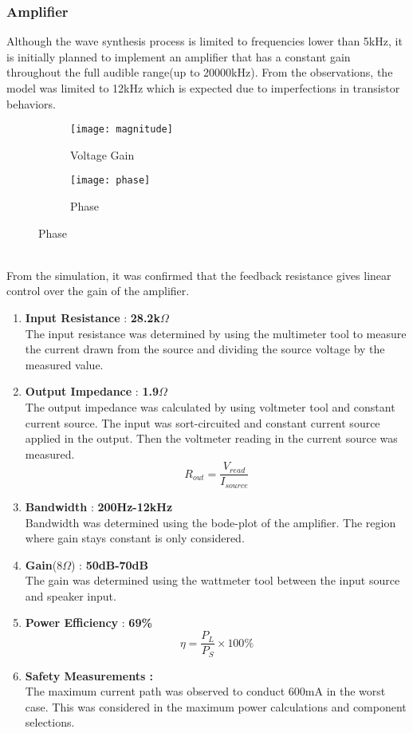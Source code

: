 \subsubsection*{Amplifier}
Although the wave synthesis process is limited to frequencies lower than 5kHz, it is initially planned to implement an amplifier that has a constant gain throughout the full audible range(up to 20000kHz). From the observations, the model was limited to 12kHz which is expected due to imperfections in transistor behaviors.
\begin{figure}[h]
    \begin{subfigure}{.48\columnwidth}
        \texttt{[image: magnitude]}
        \caption*{Voltage Gain}
    \end{subfigure}
    \begin{subfigure}{.48\columnwidth}
        \texttt{[image: phase]}
        \caption*{Phase}
    \end{subfigure}
\end{figure}
\\
From the simulation, it was confirmed that the feedback resistance gives linear control over the gain of the amplifier.
\begin{enumerate}
    \item \textbf{Input Resistance} : \textbf{28.2k$\Omega$}\\The input resistance was determined by using the multimeter tool to measure the current drawn from the source and dividing the source voltage by the measured value.
    \item \textbf{Output Impedance} : \textbf{1.9$\Omega$}\\The output impedance was calculated by using voltmeter tool and constant current source. The input was sort-circuited and constant current source applied in the output. Then the voltmeter reading in the current source was measured.
          $$R_{out}=\frac{V_{read}}{I_{source}}$$
    \item \textbf{Bandwidth} : \textbf{200Hz-12kHz}\\Bandwidth was determined using the bode-plot of the amplifier. The region where gain stays constant is only considered.
    \item \textbf{Gain}(8$\Omega$) : \textbf{50dB-70dB}\\The gain was determined using the wattmeter tool between the input source and speaker input.
    \item \textbf{Power Efficiency} : \textbf{69\%}\\
          $$\eta=\frac{P_L}{P_S}\times 100\%$$
    \item \textbf{Safety Measurements :} \\
          The maximum current path was observed to conduct 600mA in the worst case. This was considered in the maximum power calculations and component selections.
\end{enumerate}

